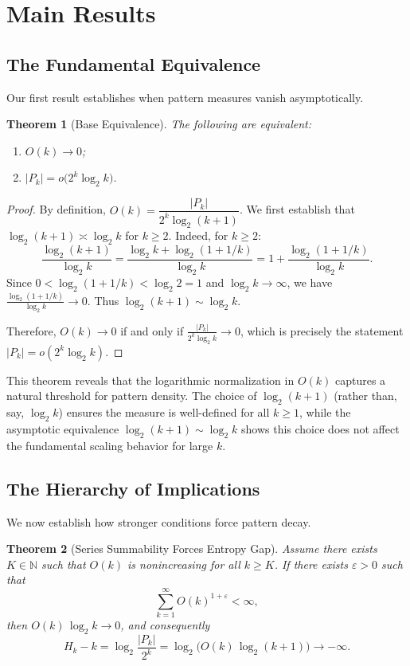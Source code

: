 \documentclass[11pt]{article}
\newtheorem{theorem}{Theorem}
\theoremstyle{definition}
\newcommand{\bbN}{\mathbb{N}}
\newcommand{\eps}{\varepsilon}
\begin{document}
\section{Main Results}

\subsection{The Fundamental Equivalence}

Our first result establishes when pattern measures vanish asymptotically.

\begin{theorem}[Base Equivalence]\label{thm:base-equivalence}
The following are equivalent:
\begin{enumerate}
\item[(i)] $O(k)\to 0$;
\item[(ii)] $|P_k|=o\big(2^k\log_2 k\big)$.
\end{enumerate}
\end{theorem}

\begin{proof}
By definition, $O(k)=\dfrac{|P_k|}{2^k\log_2(k+1)}$. We first establish that $\log_2(k+1)\asymp\log_2 k$ for $k\geq 2$. Indeed, for $k\geq 2$:
$$\frac{\log_2(k+1)}{\log_2 k} = \frac{\log_2 k + \log_2(1 + 1/k)}{\log_2 k} = 1 + \frac{\log_2(1 + 1/k)}{\log_2 k}.$$
Since $0 < \log_2(1 + 1/k) < \log_2 2 = 1$ and $\log_2 k \to \infty$, we have $\frac{\log_2(1 + 1/k)}{\log_2 k} \to 0$. Thus $\log_2(k+1) \sim \log_2 k$.

Therefore, $O(k)\to 0$ if and only if $\frac{|P_k|}{2^k\log_2 k}\to 0$, which is precisely the statement $|P_k|=o(2^k\log_2 k)$.
\end{proof}

This theorem reveals that the logarithmic normalization in $O(k)$ captures a natural threshold for pattern density. The choice of $\log_2(k+1)$ (rather than, say, $\log_2 k$) ensures the measure is well-defined for all $k \geq 1$, while the asymptotic equivalence $\log_2(k+1) \sim \log_2 k$ shows this choice does not affect the fundamental scaling behavior for large $k$.

\subsection{The Hierarchy of Implications}

We now establish how stronger conditions force pattern decay.

\begin{theorem}[Series Summability Forces Entropy Gap]\label{thm:series-to-entropy}
Assume there exists $K \in \bbN$ such that $O(k)$ is nonincreasing for all $k \ge K$. If there exists $\eps>0$ such that
\begin{equation}
\sum_{k=1}^{\infty} O(k)^{1+\eps} < \infty,
\end{equation}
then $O(k)\,\log_2 k\to 0$, and consequently
\begin{equation}
H_k-k=\log_2\frac{|P_k|}{2^k}=\log_2\big(O(k)\,\log_2(k+1)\big)\longrightarrow -\infty.
\end{equation}
\end{theorem}
\end{document}
